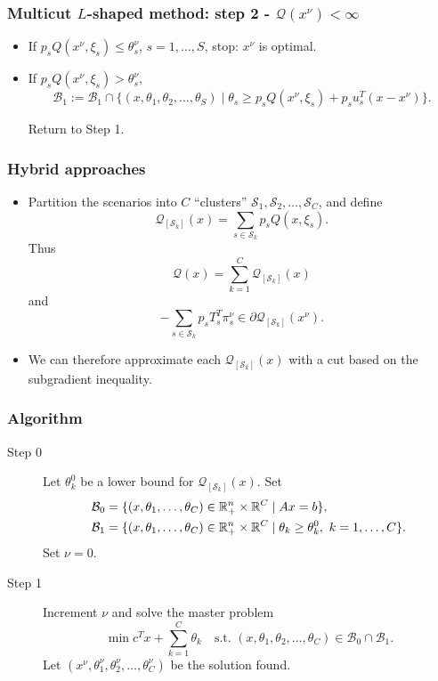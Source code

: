 \documentclass[aspectratio=169]{beamer}
\begin{document}
\begin{frame}
\frametitle{Multicut $L$-shaped method: step 2 - $\mathcal{Q}(x^{\nu}) < \infty$}
	
\begin{itemize}
\item
If $p_s Q(x^{\nu}, \xi_s) \leq \theta_s^{\nu}$, $s = 1,\ldots,S$, stop: $x^{\nu}$ is optimal.
\item
If $p_s Q(x^{\nu}, \xi_s) > \theta_s^{\nu}$,
\[
\mathcal{B}_1 := \mathcal{B}_1 \cap \lbrace (x,\theta_1,\theta_2,\ldots,\theta_S) \mid
\theta_s \geq p_s Q(x^{\nu}, \xi_s) + p_s u_s^T(x-x^{\nu})\rbrace.
\]
		
Return to Step 1.
\end{itemize}
	
\end{frame}

\begin{frame}
\frametitle{Hybrid approaches}

\begin{itemize}
	\item
	Partition the scenarios into $C$ ``clusters'' $\mathcal{S}_1, \mathcal{S}_2, \ldots, \mathcal{S}_C$, and define
	\[
	\mathcal{Q}_{[\mathcal{S}_k]}(x) = \sum_{s \in \mathcal{S}_k} p_s Q(x, \xi_s).
	\]
	Thus
	\[
	\mathcal{Q}(x) = \sum_{k = 1}^C \mathcal{Q}_{[\mathcal{S}_k]}(x)
	\]
	and
	\[
	-\sum_{s \in \mathcal{S}_k} p_s T_s^T\pi_s^{\nu}
	\in \partial \mathcal{Q}_{[\mathcal{S}_k]}(x^{\nu}).
	\]
	\item
	We can therefore approximate each $\mathcal{Q}_{[\mathcal{S}_k]}(x)$ with a cut based on the subgradient inequality.
\end{itemize}

\end{frame}

\begin{frame}
\frametitle{Algorithm}

\begin{description}
\item[Step 0]
Let $\theta_k^0$ be a lower bound for $\mathcal{Q}_{[\mathcal{S}_k]}(x)$.
Set
\begin{align*}
\mathcal{B}_0 &= \lbrace (x, \theta_1, \ldots, \theta_C) \in {\mathbb{R}}^n_+ \times {\mathbb{R}}^C \mid Ax = b \rbrace, \\
\mathcal{B}_1 &= \lbrace (x, \theta_1, \ldots, \theta_C) \in {\mathbb{R}}^n_+ \times {\mathbb{R}}^C \mid \theta_k \geq \theta_k^0,\ k = 1,\ldots,C \rbrace.
\end{align*}
Set $\nu = 0$.
\item[Step 1]
Increment $\nu$ and solve the {\blue master problem}
\[
\min c^Tx + \sum_{k = 1}^C \theta_k \quad \text{s.t. } (x, \theta_1,
\theta_2,\ldots,  \theta_C) \in \mathcal{B}_0 \cap \mathcal{B}_1.
\]
Let $(x^{\nu}, \theta_1^{\nu}, \theta_2^{\nu},\ldots,
\theta_C^{\nu})$ be the solution found.
\end{description}

\end{frame}
\end{document}
